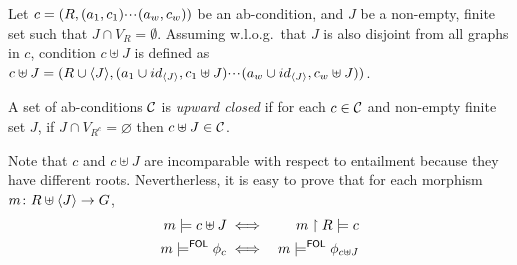 \begin{definition}
  \label{def:adding-nodes-to-condition}
  Let $c = (R,(a_1,c_1){\cdotp\mkern-2mu\cdotp\mkern-2mu\cdotp\mkern1mu} (a_w,c_w))$ be an ab-condition, and $J$ be a non-empty, finite set such that $J \cap V_R = \emptyset$. Assuming w.l.o.g.~that $J$ is also disjoint from all graphs in $c$, condition $c \uplus J$ is defined as $c \uplus J = (R \cup \langle J \rangle, (a_1 \cup id_{\langle J \rangle}, c_1 \uplus J){\cdotp\mkern-2mu\cdotp\mkern-2mu\cdotp\mkern1mu}(a_w \cup id_{\langle J \rangle}, c_w \uplus J))$. 

  A set of ab-conditions $\mathcal{C}$ is \emph{upward closed} if for each $c \in \mathcal{C}$ and non-empty finite set $J$, if $J \cap V_{R^c} = \varnothing$ then $c \uplus J \in \mathcal{C}$.
\end{definition}

Note that $c$ and $c \uplus J$ are incomparable with respect to entailment because they have different roots. Nevertherless, it is easy to prove that  
for each morphism $m \colon R \uplus \langle J \rangle \rightarrow G$,
\begin{eqnarray}
m \sat c \uplus J & \iff & m \restr R \sat c \eqlabel{eq:modRestricted}\\
m\sat^\FOL \phi_c & \iff & m \sat^\FOL \phi_{c\uplus J} \eqlabel{eq:condExpanded}
\end{eqnarray}

